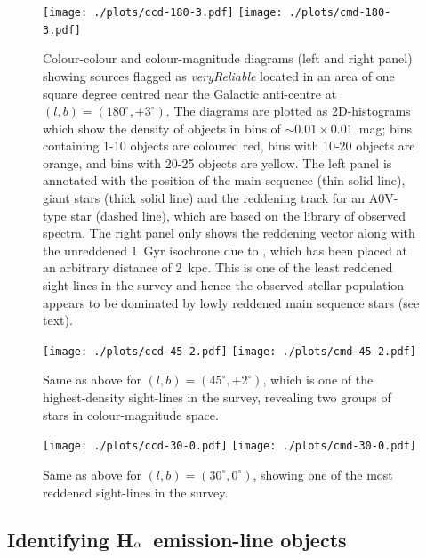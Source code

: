 \documentclass[useAMS,usenatbib]{mn2e}
\def\ha{\mbox{H$\rm \alpha$}}
\begin{document}
\begin{figure}
    \begin{minipage}[b]{\linewidth}
        \texttt{[image: ./plots/ccd-180-3.pdf]} 
        \texttt{[image: ./plots/cmd-180-3.pdf]}
    \end{minipage}
    \caption{Colour-colour and colour-magnitude diagrams
    (left and right panel)
    showing sources flagged as \emph{veryReliable}
    located in an area of one square degree
    centred near the Galactic anti-centre 
    at $(l,b)=(180^\circ,+3^\circ)$.
    The diagrams are plotted as 2D-histograms
    which show the density of objects
    in bins of $\sim0.01\times0.01$~mag;
    bins containing 1-10 objects are coloured red,
    bins with 10-20 objects are orange,
    and bins with 20-25 objects are yellow.
    The left panel is annotated with
    the position of the main sequence (thin solid line),
    giant stars (thick solid line)
    and the reddening track for an A0V-type star (dashed line),
    which are based on the \citet{Pickles1998} library
    of observed spectra.
    The right panel only shows the reddening vector
    along with the unreddened 1~Gyr isochrone due to \citet{Bressan2012},
    which has been placed at an arbitrary distance of 2~kpc.
    This is one of the least reddened sight-lines
    in the survey
    and hence the observed stellar population appears to be dominated 
    by lowly reddened main sequence stars (see text).}
    \label{fig:l180}
    \begin{minipage}[b]{\linewidth}
        \texttt{[image: ./plots/ccd-45-2.pdf]}
        \texttt{[image: ./plots/cmd-45-2.pdf]}
    \end{minipage}
    \caption{Same as above for $(l,b)=(45^\circ,+2^\circ)$,
    which is one of the highest-density sight-lines in the survey,
    revealing two groups of stars in colour-magnitude space.}
    \label{fig:l45}
    \begin{minipage}[b]{\linewidth}
        \texttt{[image: ./plots/ccd-30-0.pdf]}
        \texttt{[image: ./plots/cmd-30-0.pdf]} 
    \end{minipage}
    \caption{Same as above for $(l,b)=(30^\circ,0^\circ)$,
    showing one of the most reddened sight-lines in the survey.
    }
    \label{fig:l30}
\end{figure}

\subsection{Identifying \ha\ emission-line objects}
\end{document}
